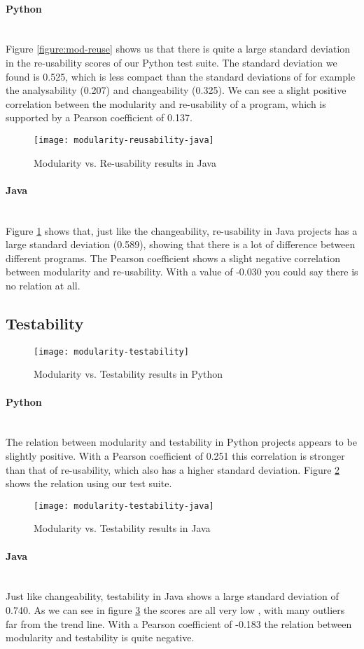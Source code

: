 \documentclass[twoside]{uva-inf-bachelor-thesis}
\newcommand{\myparagraph}[1]{\paragraph{#1}\mbox{}\\}
\begin{document}
\myparagraph{Python}
Figure \ref{figure:mod-reuse} shows us that there is quite  a large standard deviation in the re-usability scores of our Python test suite. The standard deviation we found is 0.525, which is less compact than the standard deviations of for example the analysability (0.207) and changeability (0.325). We can see a slight positive correlation between the modularity and re-usability of a program, which is supported by a Pearson coefficient of 0.137.

\begin{figure}[H]
    \caption{Modularity vs. Re-usability results in Java}
    \label{figure:mod-reuse-java}
    \centering
        \texttt{[image: modularity-reusability-java]}
\end{figure}

\myparagraph{Java}
Figure \ref{figure:mod-reuse-java} shows that, just like the changeability, re-usability in Java projects has a large standard deviation (0.589), showing that  there is a lot of difference between different programs. The Pearson coefficient shows a slight negative correlation between modularity and re-usability. With a value of -0.030 you could say there is no relation at all.

\subsection{Testability}

\begin{figure}[H]
    \caption{Modularity vs. Testability results in Python}
    \label{figure:mod-test}
    \centering
        \texttt{[image: modularity-testability]}
\end{figure}

\myparagraph{Python}
The relation between modularity and testability in Python projects appears to be  slightly positive. With a Pearson coefficient of 0.251 this correlation is stronger than that of re-usability, which also has a higher standard deviation. Figure \ref{figure:mod-test} shows the relation using our test suite.

\begin{figure}[H]
    \caption{Modularity vs. Testability results in Java}
    \label{figure:mod-test-java}
    \centering
        \texttt{[image: modularity-testability-java]}
\end{figure}

\myparagraph{Java}
Just like changeability, testability in Java shows a large standard deviation of 0.740. As we can see in figure \ref{figure:mod-test-java} the scores are all very low , with many outliers far from the trend line. With a Pearson coefficient of -0.183 the relation between modularity and testability is quite negative.
\end{document}
